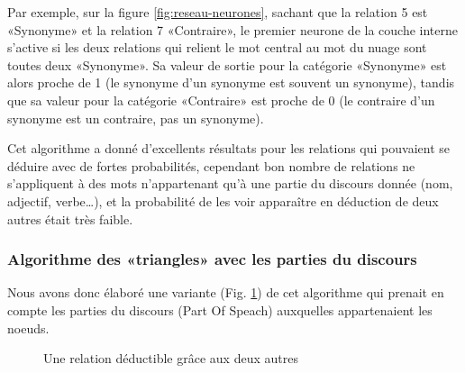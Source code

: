 \documentclass[a4paper,11pt,french]{article}
\begin{document}
Par exemple, sur la figure \ref{fig:reseau-neurones}, sachant que la relation 5 est «Synonyme» et la relation 7 «Contraire», le premier
neurone de la couche interne s'active si les deux relations qui relient le mot central au mot du nuage sont toutes deux «Synonyme». Sa
valeur de sortie pour la catégorie «Synonyme» est alors proche de 1 (le synonyme d'un synonyme est souvent un synonyme), tandis que sa
valeur pour la catégorie «Contraire» est proche de 0 (le contraire d'un synonyme est un contraire, pas un synonyme).

Cet algorithme a donné d'excellents résultats pour les relations qui pouvaient se déduire avec de fortes probabilités, cependant bon nombre
de relations ne s'appliquent à des mots n'appartenant qu'à une partie du discours donnée (nom, adjectif, verbe…), et la probabilité de les
voir apparaître en déduction de deux autres était très faible.

\subsubsection{Algorithme des «triangles» avec les parties du discours}

Nous avons donc élaboré une variante (Fig. \ref{fig:algo-triangles-pos}) de cet algorithme qui prenait en compte les parties du discours
(Part Of Speach) auxquelles appartenaient les noeuds.

\begin{figure}[ht]
  \centering
  \begin{center}
  \end{center}
  \caption{Une relation déductible grâce aux deux autres}
  \label{fig:algo-triangles-pos}
\end{figure}
\end{document}
